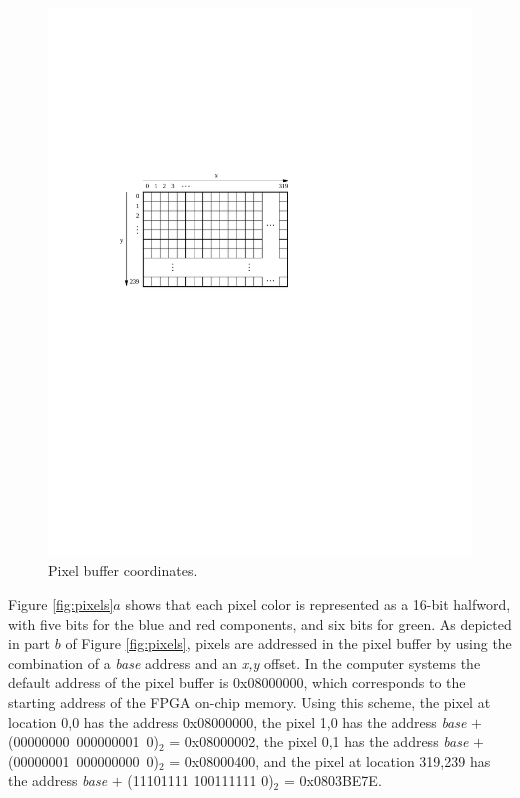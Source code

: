\documentclass[epsfig,10pt,fullpage]{article}
\begin{document}
\begin{figure}[h!]
   \begin{center}
       \includegraphics{figures/fig_video_coord.pdf}
   \end{center}
   \caption{Pixel buffer coordinates.}
	\label{fig:video_coord}
\end{figure}


Figure \ref{fig:pixels}$a$ shows that each pixel color is represented as a 16-bit halfword, 
with five bits for the blue and red 
components, and six bits for green.  As depicted in part $b$ of Figure \ref{fig:pixels}, 
pixels are addressed in the pixel buffer by 
using the combination of a {\it base} address and an {\it x,y} offset.  In the computer systems
the default address of the pixel buffer is {\sf 0x08000000},
which corresponds to the starting address of the FPGA on-chip memory.
Using this scheme, the pixel at location 0,0 has the address {\sf 0x08000000}, 
the pixel 1,0 has the address {\it base} $+$ (00000000~000000001~0)$_2$ = {\sf 0x08000002}, 
the pixel 0,1 has the address {\it base} $+$ (00000001~000000000~0)$_2$ = {\sf 0x08000400}, and 
the pixel at location 319,239 has the address {\it base} $+$ (11101111 100111111 0)$_2$ = 
{\sf 0x0803BE7E}. 
\end{document}

